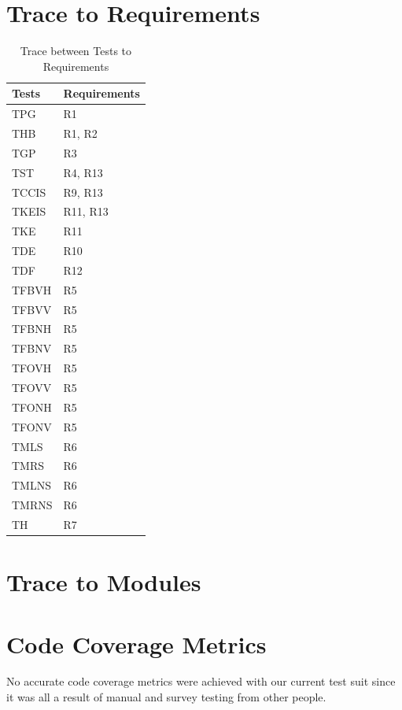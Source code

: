\documentclass[12pt, titlepage]{article}
\begin{document}
\section{Trace to Requirements}
\begin{table}[!htbp]
\begin{tabular}{ll}
\toprule
Tests & Requirements \\
\midrule
TPG & R1 \\
THB & R1, R2 \\
TGP & R3 \\
TST & R4, R13 \\
TCCIS & R9, R13 \\
TKEIS & R11, R13 \\
TKE & R11 \\
TDE & R10 \\
TDF & R12 \\
TFBVH & R5 \\
TFBVV & R5 \\
TFBNH & R5 \\
TFBNV & R5 \\
TFOVH & R5 \\
TFOVV & R5 \\
TFONH & R5 \\
TFONV & R5 \\
TMLS & R6 \\
TMRS & R6 \\
TMLNS & R6 \\
TMRNS & R6 \\
TH & R7\\
\midrule
\end{tabular}
\caption{Trace between Tests to Requirements}
\label{Table}
\end{table}
	

\section{Trace to Modules}		

\section{Code Coverage Metrics}
No accurate code coverage metrics were achieved with our current test suit since it was all a result of manual and survey testing from other people. 




\end{document}
